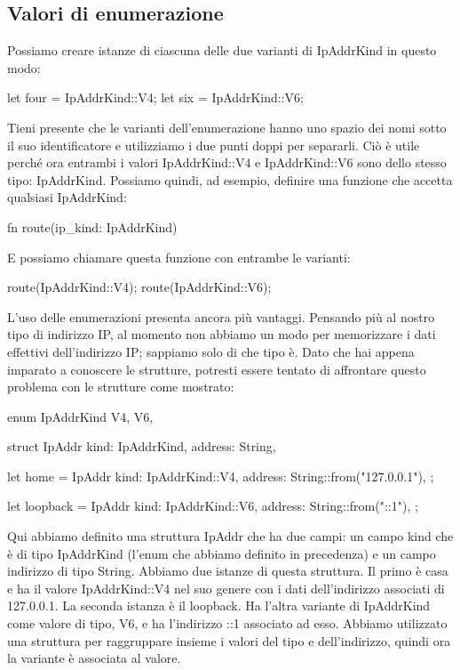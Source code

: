 \documentclass[11pt,a4paper]{article}
\begin{document}
\subsection{Valori di enumerazione}
Possiamo creare istanze di ciascuna delle due varianti di IpAddrKind in questo modo:
\begin{rust}
  let four = IpAddrKind::V4;
    let six = IpAddrKind::V6;
\end{rust}
Tieni presente che le varianti dell'enumerazione hanno uno spazio dei nomi sotto il suo identificatore e utilizziamo i due punti doppi per separarli. Ciò è utile perché ora entrambi i valori IpAddrKind::V4 e IpAddrKind::V6 sono dello stesso tipo: IpAddrKind. Possiamo quindi, ad esempio, definire una funzione che accetta qualsiasi IpAddrKind:
\begin{rust}
fn route(ip_kind: IpAddrKind) {}
\end{rust}
E possiamo chiamare questa funzione con entrambe le varianti:
\begin{rust}
    route(IpAddrKind::V4);
    route(IpAddrKind::V6);
\end{rust}
L'uso delle enumerazioni presenta ancora più vantaggi. Pensando più al nostro tipo di indirizzo IP, al momento non abbiamo un modo per memorizzare i dati effettivi dell’indirizzo IP; sappiamo solo di che tipo è. Dato che hai appena imparato a conoscere le strutture, potresti essere tentato di affrontare questo problema con le strutture come mostrato:
\begin{rust}
    enum IpAddrKind {
        V4,
        V6,
    }

    struct IpAddr {
        kind: IpAddrKind,
        address: String,
    }

    let home = IpAddr {
        kind: IpAddrKind::V4,
        address: String::from("127.0.0.1"),
    };

    let loopback = IpAddr {
        kind: IpAddrKind::V6,
        address: String::from("::1"),
    };
\end{rust}
Qui abbiamo definito una struttura IpAddr che ha due campi: un campo kind che è di tipo IpAddrKind (l'enum che abbiamo definito in precedenza) e un campo indirizzo di tipo String. Abbiamo due istanze di questa struttura. Il primo è casa e ha il valore IpAddrKind::V4 nel suo genere con i dati dell'indirizzo associati di 127.0.0.1. La seconda istanza è il loopback. Ha l'altra variante di IpAddrKind come valore di tipo, V6, e ha l'indirizzo ::1 associato ad esso. Abbiamo utilizzato una struttura per raggruppare insieme i valori del tipo e dell'indirizzo, quindi ora la variante è associata al valore.\\
\end{document}
